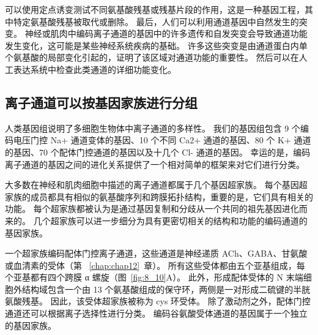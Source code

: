 可以使用定点诱变测试不同氨基酸残基或残基片段的作用，这是一种基因工程，其中特定氨基酸残基被取代或删除。
最后，人们可以利用通道基因中自然发生的突变。
神经或肌肉中编码离子通道的基因中的许多遗传和自发突变会导致通道功能发生变化，这可能是某些神经系统疾病的基础。
许多这些突变是由通道蛋白内单个氨基酸的局部变化引起的，证明了该区域对通道功能的重要性。
然后可以在人工表达系统中检查此类通道的详细功能变化。



\subsection{离子通道可以按基因家族进行分组}

人类基因组说明了多细胞生物体中离子通道的多样性。 我们的基因组包含 9 个编码电压门控 Na+ 通道变体的基因、10 个不同 Ca2+ 通道的基因、80 个 K+ 通道的基因、70 个配体门控通道的基因以及十几个 Cl- 通道的基因。
幸运的是，编码离子通道的基因之间的进化关系提供了一个相对简单的框架来对它们进行分类。


大多数在神经和肌肉细胞中描述的离子通道都属于几个基因超家族。
每个基因超家族的成员都具有相似的氨基酸序列和跨膜拓扑结构，重要的是，它们具有相关的功能。
每个超家族都被认为是通过基因复制和分歧从一个共同的祖先基因进化而来的。
几个超家族可以进一步细分为具有更密切相关的结构和功能的编码通道的基因家族。


一个超家族编码配体门控离子通道，这些通道是神经递质 ACh、GABA、甘氨酸或血清素的受体（第 ~\ref{chap:chap12}~章）。 
所有这些受体都由五个亚基组成，每个亚基都有四个跨膜 α 螺旋（图~\ref{fig:8_10}A）。 
此外，形成配体受体的 N 末端细胞外结构域包含一个由 13 个氨基酸组成的保守环，两侧是一对形成二硫键的半胱氨酸残基。
因此，该受体超家族被称为 cys 环受体。
除了激动剂之外，配体门控通道还可以根据离子选择性进行分类。
编码谷氨酸受体通道的基因属于一个独立的基因家族。


